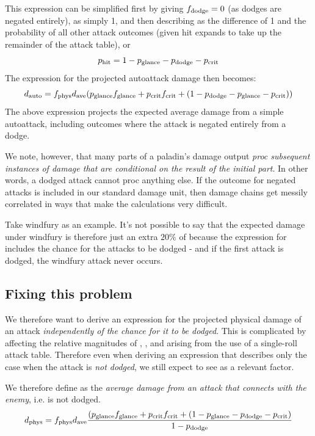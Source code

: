 This expression can be simplified first by giving $f_{\mathrm{dodge}}  = 0$ (as dodges are negated entirely), \fhit as simply 1, and then describing \phit as the difference of 1 and the probability of all other attack outcomes (given hit expands to take up the remainder of the attack table), or
\begin{equation}
	p_{\mathrm{hit}}  = 1 - p_{\mathrm{glance}}  - p_{\mathrm{dodge}}  - p_{\mathrm{crit}} 
\end{equation}
The expression for the projected autoattack damage then becomes:
\begin{equation}
	d_{\mathrm{auto}}  = f_{\mathrm{phys}}  d_{\mathrm{ave}}  (p_{\mathrm{glance}}  f_{\mathrm{glance}}  + p_{\mathrm{crit}}  f_{\mathrm{crit}}  + (1 - p_{\mathrm{dodge}}  - p_{\mathrm{glance}}  - p_{\mathrm{crit}} ))
\end{equation}
The above expression projects the expected average damage from a simple autoattack, including outcomes where the attack is negated entirely from a dodge.

We note, however, that many parts of a paladin's damage output \emph{proc subsequent instances of damage that are conditional on the result of the initial part}.
In other words, a dodged attack cannot proc anything else.
If the outcome for negated attacks is included in our standard damage unit, then damage chains get messily correlated in ways that make the calculations very difficult.

Take windfury as an example.
It's not possible to say that the expected damage under windfury is therefore just an extra $20\%$ of \dauto because the expression for \dauto includes the chance for the attacks to be dodged - and if the first attack is dodged, the windfury attack never occurs.

\subsection{Fixing this problem}
We therefore want to derive an expression for the projected physical damage of an attack \emph{independently of the chance for it to be dodged}.
This is complicated by \pdodge affecting the relative magnitudes of \phit, \pglance, and \pcrit arising from the use of a single-roll attack table.
Therefore even when deriving an expression that describes only the case when the attack is \emph{not dodged}, we still expect to see \pdodge as a relevant factor.

We therefore define \dphys as the \emph{average damage from an attack that connects with the enemy}, i.e. is not dodged.
\begin{equation}
	d_{\mathrm{phys}}  = f_{\mathrm{phys}}  d_{\mathrm{ave}}  \frac{(p_{\mathrm{glance}}  f_{\mathrm{glance}}  + p_{\mathrm{crit}}  f_{\mathrm{crit}}  + (1 - p_{\mathrm{glance}}  - p_{\mathrm{dodge}}  - p_{\mathrm{crit}} )}{1 - p_{\mathrm{dodge}} }
\end{equation}

